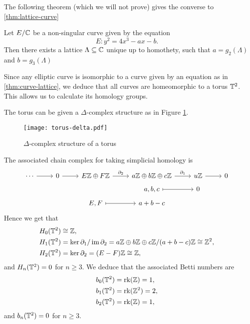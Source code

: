 The following theorem (which we will not prove) gives the converse to \ref{thm:lattice-curve}

\begin{theorem}
	\label{thm:curve-lattice}
	Let $E/\mathbb{C}$ be a non-singular curve given by the equation
	\begin{equation*}
		E: y^2 = 4x^3 - ax - b.
	\end{equation*} 
	Then there exists a lattice
	$\Lambda \subseteq \mathbb{C}$ unique up to homothety, such that
	$a = g_2(\Lambda)$ and $b = g_3(\Lambda)$
\end{theorem}

Since any elliptic curve is isomorphic to a curve given by an equation as in
\ref{thm:curve-lattice}, we deduce that all curves are homeomorphic
to a torus $\mathbb{T}^2$. This allows us to calculate its homology groups.

The torus can be given a $\Delta$-complex structure
as in Figure \ref{fig:torus-delta}.
\begin{figure}[h]
	\centering 
	\texttt{[image: torus-delta.pdf]}
	\caption[torus-delta]{$\Delta$-complex structure of a torus}
	\label{fig:torus-delta}
\end{figure}
The associated chain complex for taking simplicial homology is 
\begin{equation*}
	\begin{tikzcd}[row sep=tiny]
	\cdots & 0 & {E\Z \oplus F\Z} & {a\Z\oplus b\Z\oplus c\Z} & u\Z & 0 \\
	&&& {a,b,c} & 0 \\
	&& {E,F} & {a +b-c}
	\arrow["\partial_1", from=1-4, to=1-5]
	\arrow["\partial_2", from=1-3, to=1-4]
	\arrow[from=1-5, to=1-6]
	\arrow[from=1-2, to=1-3]
	\arrow[from=1-1, to=1-2]
	\arrow[maps to, from=3-3, to=3-4]
	\arrow[maps to, from=2-4, to=2-5]
\end{tikzcd}
\end{equation*}
Hence we get that
\begin{align*}
	H_0(\mathbb{T}^2) &\cong \mathbb{Z},\\
	H_1(\mathbb{T}^2) &= \ker \partial_1 / \operatorname{im} \partial_2
	= a\mathbb{Z} \oplus b\mathbb{Z} \oplus c\mathbb{Z} / (a + b - c)\mathbb{Z} \cong \mathbb{Z}^2,\\
	H_2(\mathbb{T}^2) &= \ker \partial_2 = (E-F)\mathbb{Z} \cong \mathbb{Z},
\end{align*}
and $H_n(\mathbb{T}^2) = 0$ for $n \geq 3$.
We deduce that the associated Betti numbers are
\begin{align*}
	b_0(\mathbb{T}^2) &= \operatorname{rk}(\mathbb{Z}) = 1,\\
	b_1(\mathbb{T}^2) &= \operatorname{rk}(\mathbb{Z}^2) = 2,\\
	b_2(\mathbb{T}^2) &= \operatorname{rk}(\mathbb{Z}) = 1,
\end{align*}
and $b_n(\mathbb{T}^2) = 0$ for $n \geq 3$.
